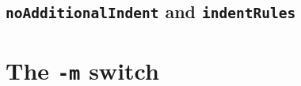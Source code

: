 \documentclass[10pt]{article}
\begin{document}
\subsection{\texttt{noAdditionalIndent} and \texttt{indentRules}}



\section{The \texttt{-m} switch}\label{sec:modifylinebreaks}
\end{document}
